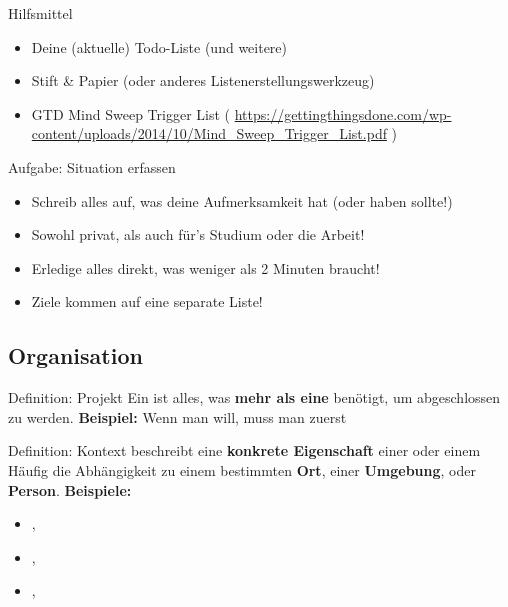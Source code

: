 \begin{frame}[c]{Hilfsmittel}
    \large
    \begin{itemize}[<+(1)->]
        \item Deine (aktuelle) Todo-Liste (und weitere)
        \item Stift \& Papier (oder anderes Listenerstellungswerkzeug)
        \item GTD Mind Sweep Trigger List \cite{trigger-list} ( \url{https://gettingthingsdone.com/wp-content/uploads/2014/10/Mind_Sweep_Trigger_List.pdf} )
    \end{itemize}
\end{frame}

\begin{frame}[c]
    \large
    \begin{block}{Aufgabe: Situation erfassen}
    \begin{itemize}
        \item Schreib alles auf, was deine Aufmerksamkeit hat (oder haben sollte!)
        \item Sowohl privat, als auch für's Studium oder die Arbeit!
        \item Erledige alles direkt, was weniger als 2 Minuten braucht!
        \item Ziele kommen auf eine separate Liste!
    \end{itemize}
    \end{block}
\end{frame}
\fpause


\subsection{Organisation}

\begin{frame}[c]{Definition: Projekt}
    Ein  ist alles, was \textbf{mehr als eine}  benötigt, um abgeschlossen zu werden. \newline \newline \pause
    \textbf{Beispiel:} Wenn man 
    will, muss man zuerst 
\end{frame}


\begin{frame}[c]{Definition: Kontext}
     beschreibt eine \textbf{konkrete Eigenschaft} einer
     oder einem  Häufig die Abhängigkeit zu einem
    bestimmten \textbf{Ort}, einer \textbf{Umgebung}, oder \textbf{Person}.
    \newline \newline \pause
    \textbf{Beispiele:}
    \begin{itemize}
        \item {}, 
        \item {}, 
        \item {}, 
    \end{itemize}
\end{frame}


